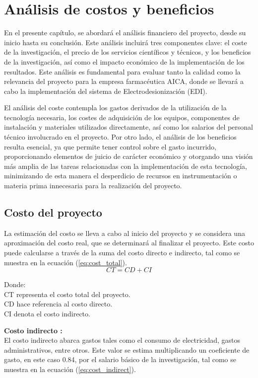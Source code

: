 \chapter{Análisis de costos y beneficios}
En el presente capítulo, se abordará el análisis financiero del proyecto, desde su inicio hasta su conclusión.
Este análisis incluirá tres componentes clave: el coste de la investigación, el precio de los servicios
científicos y técnicos, y los beneficios de la investigación, así como el impacto económico de la
implementación de los resultados. Este análisis es fundamental para evaluar tanto la calidad como la
relevancia del proyecto para la empresa farmacéutica AICA, donde se llevará a cabo la implementación
del sistema de Electrodesionización (EDI).

El análisis del coste contempla los gastos derivados de la utilización de la tecnología necesaria,
los costes de adquisición de los equipos, componentes de instalación y materiales utilizados directamente,
así como los salarios del personal técnico involucrado en el proyecto. Por otro lado, el análisis de los
beneficios resulta esencial, ya que permite tener control sobre el gasto incurrido, proporcionando elementos
de juicio de carácter económico y otorgando una visión más amplia de las tareas relacionadas con la
implementación de esta tecnología, minimizando de esta manera el desperdicio de recursos en instrumentación
o materia prima innecesaria para la realización del proyecto.


\section{Costo del proyecto}

La estimación del costo se lleva a cabo al inicio del proyecto y se considera una aproximación del costo
real, que se determinará al finalizar el proyecto. Este costo puede calcularse a través de la suma del
costo directo e indirecto, tal como se muestra en la ecuación (\ref{eq:cost_total}).
\begin{equation}
    \label{eq:cost_total}
    CT = CD + CI
\end{equation}

Donde: \\
CT representa el costo total del proyecto. \\
CD hace referencia al costo directo. \\
CI denota el costo indirecto.

\textbf{Costo indirecto :}\\
El costo indirecto abarca gastos tales como el consumo de electricidad, gastos administrativos, entre otros.
Este valor se estima multiplicando un coeficiente de gasto, en este caso 0.84, por el salario básico de la
investigación, tal como se muestra en la ecuación (\ref{eq:cost_indirect}). \\

